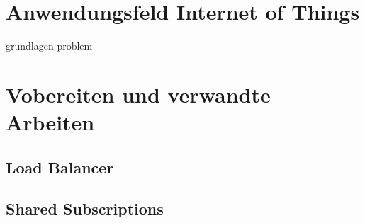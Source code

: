 \section{Anwendungsfeld Internet of Things} \label{s:domain}

{grundlagen}
{problem}

\section{Vobereiten und verwandte Arbeiten}

\subsection{Load Balancer}

\subsection{Shared Subscriptions}

